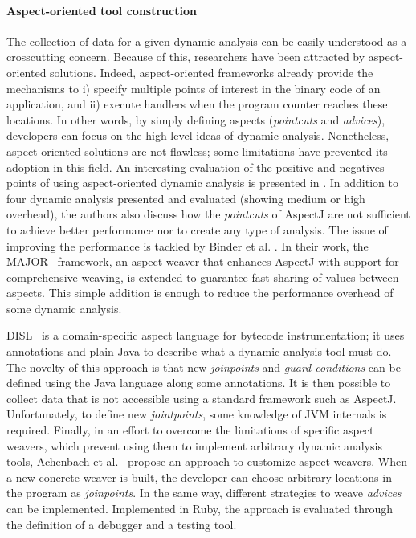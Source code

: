 \paragraph{Aspect-oriented tool construction}
The collection of data for a given dynamic analysis can be easily understood as a crosscutting concern.
Because of this, researchers have been attracted by aspect-oriented solutions.
Indeed, aspect-oriented frameworks already provide the mechanisms to i) specify multiple points of interest in the binary code of an application, and ii) execute handlers when the program counter reaches these locations.
In other words, by simply defining aspects (\textit{pointcuts} and \textit{advices}), developers can focus on the high-level ideas of dynamic analysis.
Nonetheless, aspect-oriented solutions are not flawless; some limitations have prevented its adoption in this field.
An interesting evaluation of the positive and negatives points of using aspect-oriented dynamic analysis is presented in \cite{Pearce:2007:PA:1248445.1248448}.
In addition to four dynamic analysis presented and evaluated (showing medium or high overhead), the authors also discuss how the \textit{pointcuts} of AspectJ are not sufficient to achieve better performance nor to create any type of analysis.
The issue of improving the performance is tackled by Binder et al. \cite{Binder:2006:FEM:1173706.1173733}.
In their work, the MAJOR~\cite{Villazon20111015} framework, an aspect weaver that enhances AspectJ with support for comprehensive weaving, is extended to guarantee fast sharing of values between aspects.
This simple addition is enough to reduce the performance overhead of some dynamic analysis.

DISL~\cite{Marek:2012:DEL:2162037.2162046,Marek2012} is a domain-specific aspect language for bytecode instrumentation; it uses annotations and plain Java to describe what a dynamic analysis tool must do.
The novelty of this approach is that new \textit{joinpoints} and \textit{guard conditions} can be defined using the Java language along some annotations.
It is then possible to collect data that is not accessible using a standard framework such as AspectJ.
Unfortunately, to define new \textit{jointpoints}, some knowledge of JVM internals is required.
Finally, in an effort to overcome the limitations of specific aspect weavers, which prevent using them to implement arbitrary dynamic analysis tools, Achenbach et al.~\cite{Achenbach:2010:MPD:1939399.1939415} propose an approach to customize aspect weavers.
When a new concrete weaver is built, the developer can choose arbitrary locations in the program as \textit{joinpoints}.
In the same way, different strategies to weave \textit{advices} can be implemented.
Implemented in Ruby, the approach is evaluated through the definition of a debugger and a testing tool.


